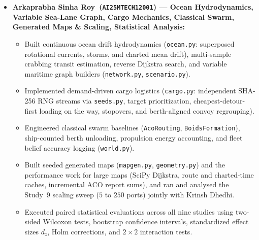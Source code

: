\documentclass[11pt,a4paper,oneside]{report}
\newcommand{\RepFirstAuthor}{Arkaprabha Sinha Roy}
\newcommand{\RepFirstRoll}{AI25MTECH12001}
\newcommand{\RepSecondAuthor}{Krinsh Dhedhi}
\begin{document}
\vspace{1pt}
\begin{sloppypar}\footnotesize
\begin{itemize}[leftmargin=1.0em, itemsep=1pt, topsep=0pt]
    \item \textbf{\RepFirstAuthor\ (\texttt{\RepFirstRoll}) --- Ocean Hydrodynamics, Variable Sea-Lane Graph, Cargo Mechanics, Classical Swarm, Generated Maps \& Scaling, Statistical Analysis:}
    \begin{itemize}[leftmargin=0.9em, itemsep=0pt, topsep=0pt]
        \item Built continuous ocean drift hydrodynamics (\texttt{ocean.py}: superposed rotational currents, storms, and charted mean drift), multi-sample crabbing transit estimation, reverse Dijkstra search, and variable maritime graph builders (\texttt{network.py}, \texttt{scenario.py}).
        \item Implemented demand-driven cargo logistics (\texttt{cargo.py}: independent SHA-256 RNG streams via \texttt{seeds.py}, target prioritization, cheapest-detour-first loading on the way, stopovers, and berth-aligned convoy regrouping).
        \item Engineered classical swarm baselines (\texttt{AcoRouting}, \texttt{BoidsFormation}), ship-counted berth unloading, propulsion energy accounting, and fleet belief accuracy logging (\texttt{world.py}).
        \item Built seeded generated maps (\texttt{mapgen.py}, \texttt{geometry.py}) and the performance work for large maps (SciPy Dijkstra, route and charted-time caches, incremental ACO report sums), and ran and analysed the Study~9 scaling sweep ($5$ to $250$ ports) jointly with \RepSecondAuthor.
        \item Executed paired statistical evaluations across all nine studies using two-sided Wilcoxon tests, bootstrap confidence intervals, standardized effect sizes $d_z$, Holm corrections, and $2\times 2$ interaction tests.
    \end{itemize}


\end{itemize}
\end{sloppypar}
\end{document}
